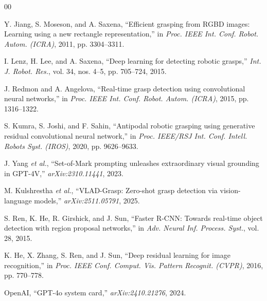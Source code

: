 \documentclass[10pt,conference,compsoc]{IEEEtran}
\begin{document}
\balance
\begin{thebibliography}{00}

Y. Jiang, S. Moseson, and A. Saxena, ``Efficient grasping from RGBD images:
Learning using a new rectangle representation,'' in \emph{Proc. IEEE Int.
Conf. Robot. Autom. (ICRA)}, 2011, pp. 3304--3311.

I. Lenz, H. Lee, and A. Saxena, ``Deep learning for detecting robotic
grasps,'' \emph{Int. J. Robot. Res.}, vol. 34, nos. 4--5, pp. 705--724, 2015.

J. Redmon and A. Angelova, ``Real-time grasp detection using convolutional
neural networks,'' in \emph{Proc. IEEE Int. Conf. Robot. Autom. (ICRA)},
2015, pp. 1316--1322.

S. Kumra, S. Joshi, and F. Sahin, ``Antipodal robotic grasping using
generative residual convolutional neural network,'' in \emph{Proc. IEEE/RSJ
Int. Conf. Intell. Robots Syst. (IROS)}, 2020, pp. 9626--9633.

J. Yang \emph{et al.}, ``Set-of-Mark prompting unleashes extraordinary
visual grounding in GPT-4V,'' \emph{arXiv:2310.11441}, 2023.

M. Kulshrestha \emph{et al.}, ``VLAD-Grasp: Zero-shot grasp detection via
vision-language models,'' \emph{arXiv:2511.05791}, 2025.

S. Ren, K. He, R. Girshick, and J. Sun, ``Faster R-CNN: Towards real-time
object detection with region proposal networks,'' in \emph{Adv. Neural Inf.
Process. Syst.}, vol. 28, 2015.

K. He, X. Zhang, S. Ren, and J. Sun, ``Deep residual learning for image
recognition,'' in \emph{Proc. IEEE Conf. Comput. Vis. Pattern Recognit.
(CVPR)}, 2016, pp. 770--778.

OpenAI, ``GPT-4o system card,'' \emph{arXiv:2410.21276}, 2024.

\end{thebibliography}
\end{document}
